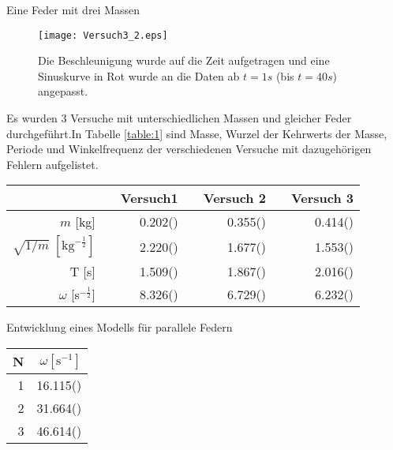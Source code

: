 \documentclass{alex_gp}
\begin{document}
\begin{mybox}{Eine Feder mit drei Massen}
	\begin{figure}[H]
		\vspace{-1cm}		
		\centering
		\texttt{[image: Versuch3\_2.eps]}
		\caption{Die Beschleunigung wurde auf die Zeit aufgetragen und eine Sinuskurve in Rot wurde an die Daten ab \( t = 1 \unit{s} \) (bis \( t = 40 \unit{s} \)) angepasst.}
		\label{fig:sine}
	\end{figure}
	
	Es wurden 3 Versuche mit unterschiedlichen Massen und gleicher Feder durchgeführt.In Tabelle \ref{table:1} sind Masse, Wurzel der Kehrwerts der Masse, Periode und Winkelfrequenz der verschiedenen Versuche mit dazugehörigen Fehlern aufgelistet. \par
	\centering
	\begin{tabular}{@{}r c r c r c r @{}}\toprule
		&& Versuch1 && Versuch 2 && Versuch 3 \\ \midrule
		\( m \) [kg] && 0.202() && 0.355() && 0.414() \\
		\( \sqrt{1/m}\; [\text{kg}^{-\tfrac{1}{2}}] \) && 2.220() && 1.677() && 1.553() \\
		T [s] && 1.509() && 1.867() && 2.016() \\
		$\omega$ [s\( ^{-\tfrac{1}{2}} \)] && 8.326() && 6.729() && 6.232() \\
		\bottomrule
	\end{tabular}
	\label{table:1}
	
	
\end{mybox}

\begin{mybox}{Entwicklung eines Modells für parallele Federn}
	\begin{tabular}{@{}r | r @{}}\toprule
		N & \( \omega [\text{s}^{-1}]\) \\ \midrule
		1 & 16.115() \\
		2 & 31.664() \\
		3 & 46.614() \\
		\bottomrule
	\end{tabular}
\end{mybox}

\begin{mybox}{}

\end{mybox}
\end{document}
